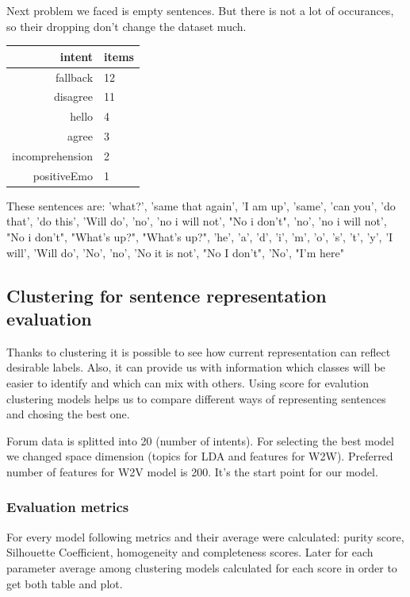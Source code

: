 \documentclass[11pt]{article}
\begin{document}
Next problem we faced is empty sentences. But there is not a lot of occurances, so their dropping don't change the dataset much.

\begin{tabular}{ |r|l| }
\hline
intent & items \\ \hline
fallback          & 12 \\ \hline
disagree          & 11 \\ \hline
hello             &  4 \\ \hline
agree             &  3 \\ \hline
incomprehension   &  2 \\ \hline
positiveEmo       &  1 \\ \hline
\end{tabular}

These sentences are: 'what?', 'same that again', 'I am up', 'same', 'can you',
       'do that', 'do this', 'Will do', 'no', 'no i will not',
       "No i don't", 'no', 'no i will not', "No i don't", "What's up?",
       "What's up?", 'he', 'a', 'd', 'i', 'm', 'o', 's', 't', 'y',
       'I will', 'Will do', 'No', 'no', 'No it is not', "No I don't",
       'No', "I'm here"


\subsection{Clustering for sentence representation evaluation}
\label{subsec:clustering2}

Thanks to clustering it is possible to see how current representation can reflect desirable labels. Also, it can provide us with information which classes will be easier to identify and which can mix with others. Using score for evalution clustering models helps us to compare different ways of representing sentences and chosing the best one.


Forum data is splitted into 20 (number of intents). For selecting the best model we changed space dimension (topics for LDA and features for W2W). Preferred number of features for W2V model is 200. It's the start point for our model.

\subsubsection{Evaluation metrics}

For every model following metrics and their average were calculated: purity score, Silhouette Coefficient, homogeneity and completeness scores. Later for each parameter average among clustering models calculated for each score in order to get both table and plot.
\end{document}
